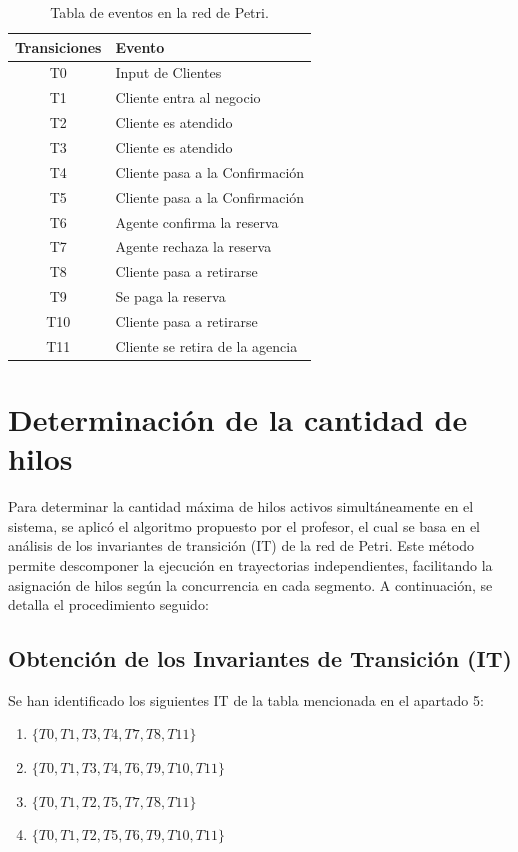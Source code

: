 \documentclass[12pt]{article}
\begin{document}
\begin{table}[H]
    \centering
    \renewcommand{\arraystretch}{1.2}
    \begin{tabularx}{\textwidth}{|c|X|}
    \hline
    \rowcolor{green!20}
    \textbf{Transiciones} & \textbf{Evento} \\ \hline
    T0  & Input de Clientes                \\ \hline
    T1  & Cliente entra al negocio         \\ \hline
    T2  & Cliente es atendido              \\ \hline
    T3  & Cliente es atendido              \\ \hline
    T4  & Cliente pasa a la Confirmación   \\ \hline
    T5  & Cliente pasa a la Confirmación   \\ \hline
    T6  & Agente confirma la reserva       \\ \hline
    T7  & Agente rechaza la reserva        \\ \hline
    T8  & Cliente pasa a retirarse         \\ \hline
    T9  & Se paga la reserva               \\ \hline
    T10 & Cliente pasa a retirarse         \\ \hline
    T11 & Cliente se retira de la agencia  \\ \hline
    \end{tabularx}
    \caption{Tabla de eventos en la red de Petri.}
    \label{tabla:eventos-red-petri}
\end{table}


\section{Determinación de la cantidad de hilos}

Para determinar la cantidad máxima de hilos activos simultáneamente en el sistema, se aplicó el algoritmo propuesto por el profesor, el cual se basa en el análisis de los invariantes de transición (IT) de la red de Petri. Este método permite descomponer la ejecución en trayectorias independientes, facilitando la asignación de hilos según la concurrencia en cada segmento. A continuación, se detalla el procedimiento seguido:

\subsection{Obtención de los Invariantes de Transición (IT)}
Se han identificado los siguientes IT de la tabla mencionada en el apartado 5:
\begin{enumerate}
    \item $\{T0, T1, T3, T4, T7, T8, T11\}$
    \item $\{T0, T1, T3, T4, T6, T9, T10, T11\}$
    \item $\{T0, T1, T2, T5, T7, T8, T11\}$
    \item $\{T0, T1, T2, T5, T6, T9, T10, T11\}$
\end{enumerate}
\end{document}
